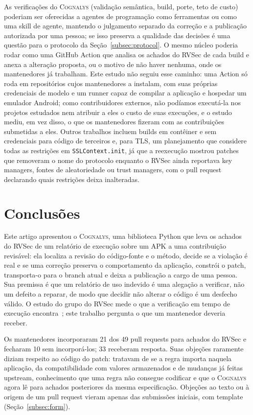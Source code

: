 \documentclass[conference]{IEEEtran}
\newcommand{\system}{\textsc{Cognalys}}
\begin{document}
As verificações do \system{} (validação semântica, build, porte, teto de custo) poderiam ser
oferecidas a agentes de programação como ferramentas ou como uma skill de agente, mantendo o julgamento separado
da correção e a publicação autorizada por uma pessoa; se isso preserva a qualidade das
decisões é uma questão para o protocolo da Seção~\ref{subsec:protocol}. O mesmo núcleo poderia rodar como uma GitHub
Action que analisa os achados do RVSec de cada build e anexa a alteração
proposta, ou o motivo de não haver nenhuma, onde os mantenedores já trabalham. Este estudo
não seguiu esse caminho: uma Action só roda em repositórios cujos mantenedores a instalam,
com suas próprias credenciais de modelo e um runner capaz de compilar a aplicação e hospedar
um emulador Android; como contribuidores externos, não podíamos executá-la nos projetos
estudados nem atribuir a eles o custo de suas execuções, e o estudo mediu, em vez disso, o que
os mantenedores fizeram com as contribuições submetidas a eles. Outros trabalhos incluem builds em contêiner e sem credenciais
para código de terceiros e, para TLS, um planejamento que considere todas as restrições
em \texttt{SSLContext.init}, já que a reexecução mostrou patches que removeram
o nome do protocolo enquanto o RVSec ainda reportava key managers, fontes de aleatoriedade ou
trust managers, com o pull request declarando quais restrições deixa
inalteradas.

\section{Conclusões}
\label{sec:conclusion}

Este artigo apresentou o \system{}, uma biblioteca Python que leva os achados do RVSec de
um relatório de execução sobre um APK a uma contribuição revisável: ela localiza a revisão
do código-fonte e o método, decide se a violação é real e se uma correção preserva o
comportamento da aplicação, constrói o patch, transporta-o para o branch atual e deixa
a publicação a cargo de uma pessoa. Sua premissa é que um relatório de uso indevido é uma
alegação a verificar, não um defeito a reparar, de modo que decidir não alterar o código
é um desfecho válido. O estudo do grupo do RVSec mede o que a verificação em tempo de
execução encontra~\cite{costa2026effectiveness}; este trabalho pergunta o que um
mantenedor deveria receber.

Os mantenedores incorporaram 21 dos 49 pull requests para achados do RVSec e fecharam 10
sem incorporá-los; 33 receberam resposta. Suas objeções raramente diziam respeito ao
código do patch: tratavam de se a regra importa naquela aplicação, da compatibilidade
com valores armazenados e de mudanças já feitas upstream, conhecimento que uma regra não
consegue codificar e que o \system{} agora lê para achados posteriores da mesma
especificação. Objeções ao texto ou à origem de um
pull request vieram apenas das submissões iniciais, com template
(Seção~\ref{subsec:form}).
\end{document}
